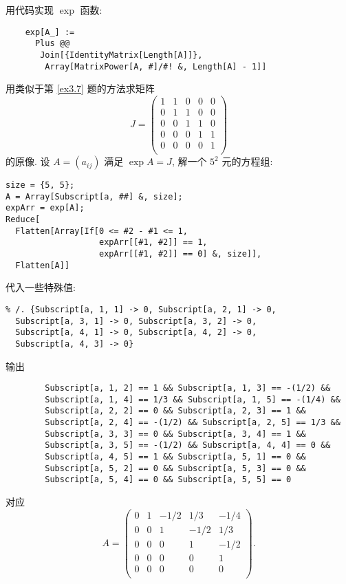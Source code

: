 \documentclass[color=black,device=normal,lang=cn,mode=geye]{elegantnote}
\begin{document}
\begin{note}
    用代码实现 $\exp$ 函数:
    \begin{lstlisting}
    exp[A_] := 
      Plus @@ 
       Join[{IdentityMatrix[Length[A]]}, 
        Array[MatrixPower[A, #]/#! &, Length[A] - 1]]
    \end{lstlisting}

    用类似于第 \ref{ex3.7} 题的方法求矩阵
    \[J=\begin{pmatrix}
        1 & 1 & 0 & 0 & 0 \\
        0 & 1 & 1 & 0 & 0 \\
        0 & 0 & 1 & 1 & 0 \\
        0 & 0 & 0 & 1 & 1 \\
        0 & 0 & 0 & 0 & 1 \\
    \end{pmatrix}\]
    的原像. 设 $A=(a_{ij})$ 满足 $\exp A=J$, 解一个 $5^2$ 元的方程组:
    \begin{lstlisting}
size = {5, 5};
A = Array[Subscript[a, ##] &, size];
expArr = exp[A];
Reduce[
  Flatten[Array[If[0 <= #2 - #1 <= 1,
                   expArr[[#1, #2]] == 1,
                   expArr[[#1, #2]] == 0] &, size]], 
  Flatten[A]]
    \end{lstlisting}

    代入一些特殊值:
    \begin{lstlisting}
% /. {Subscript[a, 1, 1] -> 0, Subscript[a, 2, 1] -> 0, 
  Subscript[a, 3, 1] -> 0, Subscript[a, 3, 2] -> 0, 
  Subscript[a, 4, 1] -> 0, Subscript[a, 4, 2] -> 0, 
  Subscript[a, 4, 3] -> 0}
    \end{lstlisting}

    输出
    \begin{lstlisting}
        Subscript[a, 1, 2] == 1 && Subscript[a, 1, 3] == -(1/2) && 
        Subscript[a, 1, 4] == 1/3 && Subscript[a, 1, 5] == -(1/4) && 
        Subscript[a, 2, 2] == 0 && Subscript[a, 2, 3] == 1 && 
        Subscript[a, 2, 4] == -(1/2) && Subscript[a, 2, 5] == 1/3 && 
        Subscript[a, 3, 3] == 0 && Subscript[a, 3, 4] == 1 && 
        Subscript[a, 3, 5] == -(1/2) && Subscript[a, 4, 4] == 0 && 
        Subscript[a, 4, 5] == 1 && Subscript[a, 5, 1] == 0 && 
        Subscript[a, 5, 2] == 0 && Subscript[a, 5, 3] == 0 && 
        Subscript[a, 5, 4] == 0 && Subscript[a, 5, 5] == 0
    \end{lstlisting}

    对应
    \[A=\begin{pmatrix}
        0 & 1 & -1/2 & 1/3 & -1/4 \\
        0 & 0 & 1 & -1/2 & 1/3 \\
        0 & 0 & 0 & 1 & -1/2 \\
        0 & 0 & 0 & 0 & 1 \\
        0 & 0 & 0 & 0 & 0 \\
    \end{pmatrix}.\]


\end{note}
\end{document}
